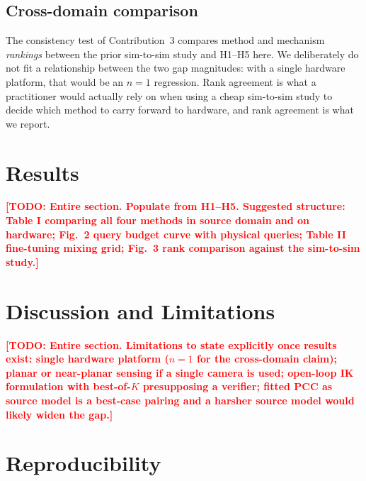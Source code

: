 \documentclass[letterpaper, 10pt, conference]{ieeeconf}
\newcommand{\todo}[1]{\textcolor{red}{\textbf{[TODO: #1]}}}
\begin{document}
\subsection{Cross-domain comparison}

The consistency test of Contribution~3 compares method and mechanism
\emph{rankings} between the prior sim-to-sim study and H1--H5 here. We
deliberately do not fit a relationship between the two gap magnitudes: with a
single hardware platform, that would be an $n{=}1$ regression. Rank agreement
is what a practitioner would actually rely on when using a cheap sim-to-sim
study to decide which method to carry forward to hardware, and rank agreement
is what we report.

\section{Results}
\label{sec:results}

\todo{Entire section. Populate from H1--H5. Suggested structure: Table I
comparing all four methods in source domain and on hardware; Fig.~2 query
budget curve with physical queries; Table II fine-tuning mixing grid;
Fig.~3 rank comparison against the sim-to-sim study.}

\section{Discussion and Limitations}

\todo{Entire section. Limitations to state explicitly once results exist:
single hardware platform ($n{=}1$ for the cross-domain claim); planar or
near-planar sensing if a single camera is used; open-loop IK formulation with
best-of-$K$ presupposing a verifier; fitted PCC as source model is a
best-case pairing and a harsher source model would likely widen the gap.}

\section*{Reproducibility}
\end{document}
